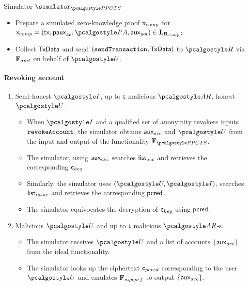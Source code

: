 \documentclass[runningheads,10pt]{llncs}
\numberwithin{equation}{section}
\begin{document}
\begin{simbox}{Simulator $\simulator_{\PPCTS}$}
\begin{enumerate}
\begin{itemize}
\begin{itemize}
      \item Prepare a simulated zero-knowledge proof $\mathsf{\pi}_{comp}$ for
        $\inp_{comp} = (\tx, \paux_{tx}, \polas, \auxpol) \in
        \LAN_{\REL_{comp}}$;
      \item Collect $\mathsf{TxData}$ and send $(\mathtt{sendTransaction}, \mathsf{TxData})$ to
        $\relay$ via $\mathbf{F}_{{amt}}$ on behalf of $\user$.
      \end{itemize}
    \end{itemize}
  \end{enumerate}

  \paragraph{Revoking account}
  \begin{enumerate}
  \item Semi-honest $\idprov$, up to $\mathsf{t}$ malicious $\ar$, honest
    $\user$.
    \begin{itemize}
    \item When $\idprov$ and a qualified set of anonymity revokers inputs
      $\mathtt{revokeAccount}$, the simulator obtains $\mathsf{aux}_{acc}$ and $\user$ from the
      input and output of the functionality $\func{\PPCTS}$.
    \item The simulator, using $\mathsf{aux}_{acc}$ searches ${\mathsf{list}_{acc}}$ and
      retrieves the corresponding $\mathsf{c}_{key}$.
    \item Similarly, the simulator uses $(\user, \idprov)$, searches
    ${\mathsf{list}_{issue}}$ and retrieves the corresponding $\mathsf{pcred}$.
    \item The simulator equivocates the decryption of $\mathsf{c}_{key}$ using $\mathsf{pcred}$.
    \end{itemize}
  \item Malicious $\user$ and up to $\mathsf{t}$ malicious $\ar$-s.
    \begin{itemize}
    \item The simulator receives $\user$ and a list of accounts
      $\{\mathsf{aux}_{acc}\}$ from the ideal functionality.
    \item The simulator looks up the ciphertext $\mathsf{c}_{pcred}$ corresponding to the
      user $\user$ and emulates $\mathbf{F}_{{mpcprf}}$ to output
      $\{\mathsf{aux}_{acc}\}$.
    \end{itemize}
  \end{enumerate}


\end{simbox}
\end{document}
